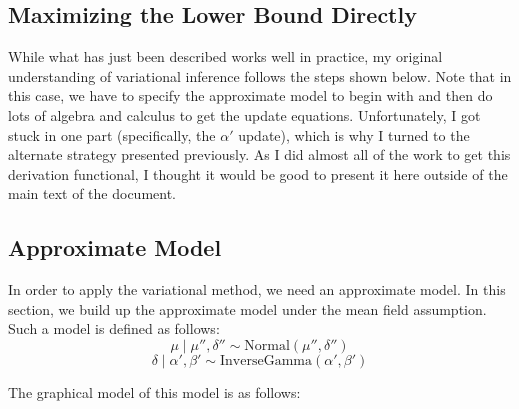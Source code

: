 \documentclass[12pt]{article}
\begin{document}
\iffalse
\begin{appendices}

\section{Maximizing the Lower Bound Directly}
While what has just been described works well in practice, my original
    understanding of variational inference follows the steps shown below.  Note
    that in this case, we have to specify the approximate model to begin with
    and then do lots of algebra and calculus to get the update equations.
    Unfortunately, I got stuck in one part (specifically, the $\alpha'$ update),
    which is why I turned to the alternate strategy presented previously.  As I
    did almost all of the work to get this derivation functional, I thought it
    would be good to present it here outside of the main text of the document.

\subsection{Approximate Model}

In order to apply the variational method, we need an approximate model.  In this
section, we build up the approximate model under the mean field assumption.
Such a model is defined as follows:
\begin{equation}
    \mu \mid \mu'', \delta'' \sim \text{Normal}(\mu'', \delta'')
\end{equation}
\begin{equation}
    \delta \mid \alpha', \beta' \sim \text{InverseGamma}(\alpha', \beta')
\end{equation}

The graphical model of this model is as follows:
\begin{center}
\end{center}
\end{appendices}
\end{document}
